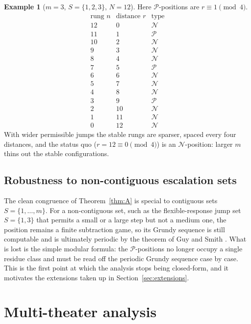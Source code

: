 \documentclass[11pt]{article}
\theoremstyle{plain}
\theoremstyle{definition}
\newtheorem{example}[theorem]{Example}
\theoremstyle{remark}
\begin{document}
\begin{example}[$m=3$, $S=\{1,2,3\}$, $N=12$]\label{ex:m3}
Here $\mathcal{P}$-positions are $r\equiv 1\pmod 4$.
\[
\begin{array}{c|c|c}
\text{rung } n & \text{distance } r & \text{type}\\\hline
12 & 0 & \mathcal{N}\\
11 & 1 & \mathcal{P}\\
10 & 2 & \mathcal{N}\\
9 & 3 & \mathcal{N}\\
8 & 4 & \mathcal{N}\\
7 & 5 & \mathcal{P}\\
6 & 6 & \mathcal{N}\\
5 & 7 & \mathcal{N}\\
4 & 8 & \mathcal{N}\\
3 & 9 & \mathcal{P}\\
2 & 10 & \mathcal{N}\\
1 & 11 & \mathcal{N}\\
0 & 12 & \mathcal{N}
\end{array}
\]
With wider permissible jumps the stable rungs are sparser, spaced every four
distances, and the status quo ($r=12\equiv 0\pmod 4$) is an
$\mathcal{N}$-position: larger $m$ thins out the stable configurations.
\end{example}


\subsection{Robustness to non-contiguous escalation sets}

The clean congruence of Theorem~\ref{thm:A} is special to contiguous sets
$S=\{1,\dots,m\}$. For a non-contiguous set, such as the flexible-response
jump set $S=\{1,3\}$ that permits a small or a large step but not a medium
one, the position remains a finite subtraction game, so its Grundy sequence
is still computable and is ultimately periodic by the theorem of Guy and
Smith \citep{guysmith1956}. What is lost is the simple modular formula: the
$\mathcal{P}$-positions no longer occupy a single residue class and must be
read off the periodic Grundy sequence case by case. This is the first point
at which the analysis stops being closed-form, and it motivates the
extensions taken up in Section~\ref{sec:extensions}.

\section{Multi-theater analysis}\label{sec:multi}
\end{document}
